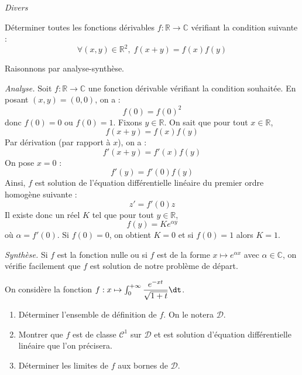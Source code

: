 \documentclass[a4paper,10pt]{report}
\begin{document}
\medskip

\begin{center}
\textit{{ {\large Divers}}}
\end{center}

\medskip





























\begin{Exa} Déterminer toutes les fonctions dérivables $f : \mathbb{R} \rightarrow \mathbb{C}$ vérifiant la condition suivante :
$$ \forall (x,y) \in \mathbb{R}^2, \; f(x+y)=f(x)f(y)$$
\end{Exa}

\corr Raisonnons par analyse-synthèse.

\medskip

\noindent \textit{Analyse.} Soit $f : \mathbb{R} \rightarrow \mathbb{C}$ une fonction dérivable vérifiant la condition souhaitée. En posant $(x,y)=(0,0)$, on a :
$$ f(0)=f(0)^2$$
donc $f(0)=0$ ou $f(0)=1$. Fixons $y \in \mathbb{R}$. On sait que pour tout $x \in \mathbb{R}$,
$$ f(x+y) = f(x)f(y)$$
Par dérivation (par rapport à $x$), on a :
$$ f'(x+y) = f'(x)f(y)$$
On pose $x=0$ :
$$ f'(y)=f'(0) f(y)$$
Ainsi, $f$ est solution de l'équation différentielle linéaire du premier ordre homogène suivante :
$$ z'= f'(0) z$$
Il existe donc un réel $K$ tel que pour tout $y \in \mathbb{R}$,
$$ f(y) = K e^{\alpha y}$$
où $\alpha = f'(0)$. Si $f(0)=0$, on obtient $K=0$ et si $f(0)=1$ alors $K=1$.

\medskip

\noindent \textit{Synthèse.} Si $f$ est la fonction nulle ou si $f$ est de la forme $x \mapsto e^{\alpha x}$ avec $\alpha \in \mathbb{C}$, on vérifie facilement que $f$ est solution de notre problème de départ.



\begin{Exa} On considère la fonction $f : x \mapsto \int_0^{+ \infty} \dfrac{e^{-xt}}{\sqrt{1+t}} \dt$.
\begin{enumerate}
\item Déterminer l'ensemble de définition de $f$. On le notera $\mathcal{D}$.
\item Montrer que $f$ est de classe $\mathcal{C}^1$ sur $\mathcal{D}$ et est solution d'équation différentielle linéaire que l'on précisera.
\item Déterminer les limites de $f$ aux bornes de $\mathcal{D}$.
\end{enumerate}
\end{Exa}
\end{document}
